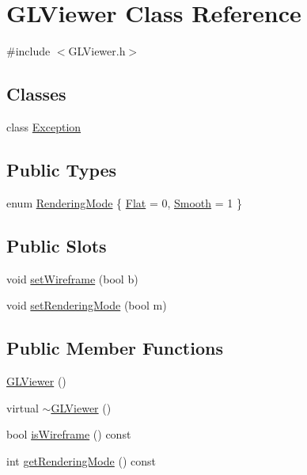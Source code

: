 \hypertarget{class_g_l_viewer}{
\section{GLViewer Class Reference}
\label{class_g_l_viewer}
}


{\ttfamily \#include $<$GLViewer.h$>$}

\subsection*{Classes}
\begin{DoxyCompactItemize}
\item 
class \hyperlink{class_g_l_viewer_1_1_exception}{Exception}
\end{DoxyCompactItemize}
\subsection*{Public Types}
\begin{DoxyCompactItemize}
\item 
enum \hyperlink{class_g_l_viewer_ae1added1addae5cd67c55931bf9f4cea}{RenderingMode} \{ \hyperlink{class_g_l_viewer_ae1added1addae5cd67c55931bf9f4ceaac5113eebea585439fcd768b6044c17aa}{Flat} = 0, 
\hyperlink{class_g_l_viewer_ae1added1addae5cd67c55931bf9f4ceaa71da216e75efdb35c2ee7d0ccea57ef4}{Smooth} = 1
 \}
\end{DoxyCompactItemize}
\subsection*{Public Slots}
\begin{DoxyCompactItemize}
\item 
void \hyperlink{class_g_l_viewer_a9fb825fd9a6e4ae542018822b16c8eee}{setWireframe} (bool b)
\item 
void \hyperlink{class_g_l_viewer_a57f4dc0af322632953bf180d804ecb19}{setRenderingMode} (bool m)
\end{DoxyCompactItemize}
\subsection*{Public Member Functions}
\begin{DoxyCompactItemize}
\item 
\hyperlink{class_g_l_viewer_a5d434ee8e5ab893c9f97d64f2db3b986}{GLViewer} ()
\item 
virtual \hyperlink{class_g_l_viewer_a3e91b413994c3f3d819275f44fd73dd2}{$\sim$GLViewer} ()
\item 
bool \hyperlink{class_g_l_viewer_a5ea5425e2ad3333b90a82032d71bbaea}{isWireframe} () const 
\item 
int \hyperlink{class_g_l_viewer_affe3dc7c0ffc0a626ddfd7fa46c49b00}{getRenderingMode} () const 
\end{DoxyCompactItemize}
